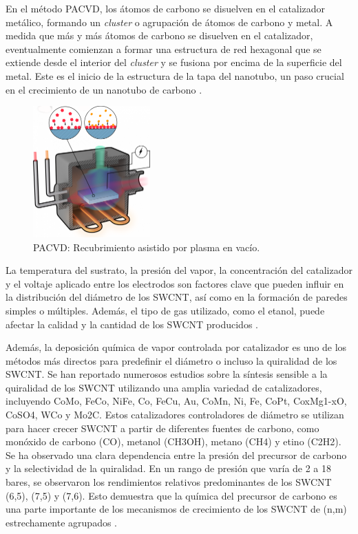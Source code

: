 \documentclass[a4paper]{article}
\begin{document}
En el método PACVD, los átomos de carbono se disuelven en el catalizador metálico, formando un \textit{cluster} o agrupación de átomos de carbono y metal. A medida que más y más átomos de carbono se disuelven en el catalizador, eventualmente comienzan a formar una estructura de red hexagonal que se extiende desde el interior del \textit{cluster} y se fusiona por encima de la superficie del metal. Este es el inicio de la estructura de la tapa del nanotubo, un paso crucial en el crecimiento de un nanotubo de carbono \cite{shibuta2003molecular}.

\begin{figure}[h!]
    \centering
    \includegraphics[width=0.4\textwidth]{images/figPACVD.png}
    \caption{PACVD: Recubrimiento asistido por plasma en vacío.}
    \label{fig:PACVD}
\end{figure}

La temperatura del sustrato, la presión del vapor, la concentración del catalizador y el voltaje aplicado entre los electrodos son factores clave que pueden influir en la distribución del diámetro de los SWCNT, así como en la formación de paredes simples o múltiples. Además, el tipo de gas utilizado, como el etanol, puede afectar la calidad y la cantidad de los SWCNT producidos \cite{kumar2010chemical}.

Además, la deposición química de vapor controlada por catalizador es uno de los métodos más directos para predefinir el diámetro o incluso la quiralidad de los SWCNT. Se han reportado numerosos estudios sobre la síntesis sensible a la quiralidad de los SWCNT utilizando una amplia variedad de catalizadores, incluyendo CoMo, FeCo, NiFe, Co, FeCu, Au, CoMn, Ni, Fe, CoPt, CoxMg1-xO, CoSO4, WCo y Mo2C. Estos catalizadores controladores de diámetro se utilizan para hacer crecer SWCNT a partir de diferentes fuentes de carbono, como monóxido de carbono (CO), metanol (CH3OH), metano (CH4) y etino (C2H2). Se ha observado una clara dependencia entre la presión del precursor de carbono y la selectividad de la quiralidad. En un rango de presión que varía de 2 a 18 bares, se observaron los rendimientos relativos predominantes de los SWCNT (6,5), (7,5) y (7,6). Esto demuestra que la química del precursor de carbono es una parte importante de los mecanismos de crecimiento de los SWCNT de (n,m) estrechamente agrupados \cite{kharlamova2023review}.
\end{document}
